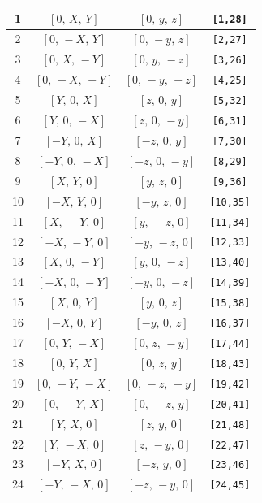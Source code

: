 \documentclass[fleqn,8pt]{jsarticle}
\begin{document}
\begin{longtable}{cccc}
1 & $\left[ 0,\, X,\, Y \right]$ & $\left[ 0,\, y,\, z \right]$ & {\tt [1,28]} \\ \hline
2 & $\left[ 0,\, - X,\, Y \right]$ & $\left[ 0,\, - y,\, z \right]$ & {\tt [2,27]} \\ \hline
3 & $\left[ 0,\, X,\, - Y \right]$ & $\left[ 0,\, y,\, - z \right]$ & {\tt [3,26]} \\ \hline
4 & $\left[ 0,\, - X,\, - Y \right]$ & $\left[ 0,\, - y,\, - z \right]$ & {\tt [4,25]} \\ \hline
5 & $\left[ Y,\, 0,\, X \right]$ & $\left[ z,\, 0,\, y \right]$ & {\tt [5,32]} \\ \hline
6 & $\left[ Y,\, 0,\, - X \right]$ & $\left[ z,\, 0,\, - y \right]$ & {\tt [6,31]} \\ \hline
7 & $\left[ - Y,\, 0,\, X \right]$ & $\left[ - z,\, 0,\, y \right]$ & {\tt [7,30]} \\ \hline
8 & $\left[ - Y,\, 0,\, - X \right]$ & $\left[ - z,\, 0,\, - y \right]$ & {\tt [8,29]} \\ \hline
9 & $\left[ X,\, Y,\, 0 \right]$ & $\left[ y,\, z,\, 0 \right]$ & {\tt [9,36]} \\ \hline
10 & $\left[ - X,\, Y,\, 0 \right]$ & $\left[ - y,\, z,\, 0 \right]$ & {\tt [10,35]} \\ \hline
11 & $\left[ X,\, - Y,\, 0 \right]$ & $\left[ y,\, - z,\, 0 \right]$ & {\tt [11,34]} \\ \hline
12 & $\left[ - X,\, - Y,\, 0 \right]$ & $\left[ - y,\, - z,\, 0 \right]$ & {\tt [12,33]} \\ \hline
13 & $\left[ X,\, 0,\, - Y \right]$ & $\left[ y,\, 0,\, - z \right]$ & {\tt [13,40]} \\ \hline
14 & $\left[ - X,\, 0,\, - Y \right]$ & $\left[ - y,\, 0,\, - z \right]$ & {\tt [14,39]} \\ \hline
15 & $\left[ X,\, 0,\, Y \right]$ & $\left[ y,\, 0,\, z \right]$ & {\tt [15,38]} \\ \hline
16 & $\left[ - X,\, 0,\, Y \right]$ & $\left[ - y,\, 0,\, z \right]$ & {\tt [16,37]} \\ \hline
17 & $\left[ 0,\, Y,\, - X \right]$ & $\left[ 0,\, z,\, - y \right]$ & {\tt [17,44]} \\ \hline
18 & $\left[ 0,\, Y,\, X \right]$ & $\left[ 0,\, z,\, y \right]$ & {\tt [18,43]} \\ \hline
19 & $\left[ 0,\, - Y,\, - X \right]$ & $\left[ 0,\, - z,\, - y \right]$ & {\tt [19,42]} \\ \hline
20 & $\left[ 0,\, - Y,\, X \right]$ & $\left[ 0,\, - z,\, y \right]$ & {\tt [20,41]} \\ \hline
21 & $\left[ Y,\, X,\, 0 \right]$ & $\left[ z,\, y,\, 0 \right]$ & {\tt [21,48]} \\ \hline
22 & $\left[ Y,\, - X,\, 0 \right]$ & $\left[ z,\, - y,\, 0 \right]$ & {\tt [22,47]} \\ \hline
23 & $\left[ - Y,\, X,\, 0 \right]$ & $\left[ - z,\, y,\, 0 \right]$ & {\tt [23,46]} \\ \hline
24 & $\left[ - Y,\, - X,\, 0 \right]$ & $\left[ - z,\, - y,\, 0 \right]$ & {\tt [24,45]} \\
\end{longtable}
\end{document}
